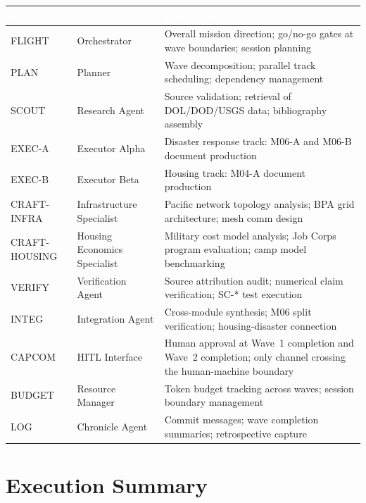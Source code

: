 \documentclass[11pt,letterpaper]{article}
\newcommand{\tableheader}[1]{\textbf{\sffamily\textcolor{white}{#1}}}
\begin{document}
\begin{center}
\begin{tabularx}{\textwidth}{L{2cm}L{3cm}X}
\toprule
{}
\tableheader{Role} & \tableheader{Agent} & \tableheader{Responsibility} \\
\midrule
FLIGHT & Orchestrator & Overall mission direction; go/no-go gates at wave boundaries; session planning \\
PLAN & Planner & Wave decomposition; parallel track scheduling; dependency management \\
SCOUT & Research Agent & Source validation; retrieval of DOL/DOD/USGS data; bibliography assembly \\
EXEC-A & Executor Alpha & Disaster response track: M06-A and M06-B document production \\
EXEC-B & Executor Beta & Housing track: M04-A document production \\
CRAFT-INFRA & Infrastructure Specialist & Pacific network topology analysis; BPA grid architecture; mesh comm design \\
CRAFT-HOUSING & Housing Economics Specialist & Military cost model analysis; Job Corps program evaluation; camp model benchmarking \\
VERIFY & Verification Agent & Source attribution audit; numerical claim verification; SC-* test execution \\
INTEG & Integration Agent & Cross-module synthesis; M06 split verification; housing-disaster connection \\
CAPCOM & HITL Interface & Human approval at Wave~1 completion and Wave~2 completion; only channel crossing the human-machine boundary \\
BUDGET & Resource Manager & Token budget tracking across waves; session boundary management \\
LOG & Chronicle Agent & Commit messages; wave completion summaries; retrospective capture \\
\bottomrule
\end{tabularx}
\end{center}

\section{Execution Summary}
\end{document}
